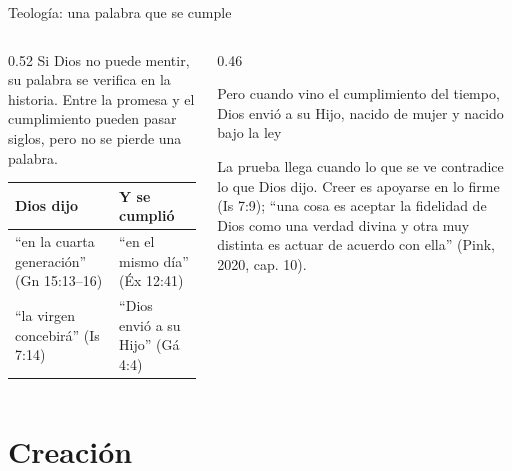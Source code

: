\begin{frame}{Teología: una palabra que se cumple}
\begin{columns}[t,onlytextwidth]
\begin{column}{0.52\textwidth}\small
Si Dios no puede mentir, su palabra se verifica en la historia. Entre la promesa y el cumplimiento pueden pasar siglos, pero no se pierde una palabra.\par\medskip
\begin{tabular}{@{}>{\RaggedRight\arraybackslash}p{2.6cm}>{\RaggedRight\arraybackslash}p{3.2cm}@{}}
\toprule
\textbf{Dios dijo} & \textbf{Y se cumplió} \\ \midrule
``en la cuarta generación'' (Gn 15:13--16) & ``en el mismo día'' (Éx 12:41) \\
``la virgen concebirá'' (Is 7:14) & ``Dios envió a su Hijo'' (Gá 4:4) \\
\bottomrule
\end{tabular}
\end{column}
\begin{column}{0.46\textwidth}
\begin{cita}Pero cuando vino el cumplimiento del tiempo, Dios envió a su Hijo, nacido de mujer y nacido bajo la ley\end{cita}
\small La prueba llega cuando lo que se ve contradice lo que Dios dijo. Creer es apoyarse en lo firme (Is 7:9); ``una cosa es aceptar la fidelidad de Dios como una verdad divina y otra muy distinta es actuar de acuerdo con ella'' (Pink, 2020, cap. 10).\par\smallskip
{}
\end{column}
\end{columns}
\end{frame}

\section{Creación}

